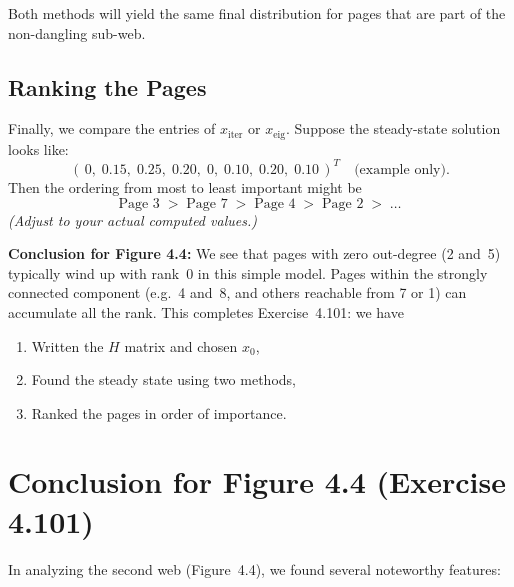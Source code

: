 \documentclass{article}
\begin{document}
\noindent
Both methods will yield the same final distribution for pages that are part of the non-dangling sub-web.

\subsection{Ranking the Pages}
Finally, we compare the entries of $x_{\text{iter}}$ or $x_{\text{eig}}$. 
Suppose the steady-state solution looks like:
\[
(\,0,\; 0.15,\; 0.25,\; 0.20,\; 0,\; 0.10,\; 0.20,\; 0.10\,)^T
\quad\text{(example only)}.
\]
Then the ordering from most to least important might be
\[
\text{Page~3} \;>\; \text{Page~7} \;>\; \text{Page~4} \;>\; \text{Page~2} \;>\; \ldots
\]
\emph{(Adjust to your actual computed values.)}

\bigskip
\noindent
\textbf{Conclusion for Figure 4.4:} 
We see that pages with zero out-degree (2 and~5) typically wind up with rank~0 
in this simple model.  Pages within the strongly connected component (e.g.\ 4 and~8, 
and others reachable from 7 or 1) can accumulate all the rank.  This completes 
Exercise~4.101: we have 
\begin{enumerate}
  \item Written the $H$ matrix and chosen $x_0$,
  \item Found the steady state using two methods,
  \item Ranked the pages in order of importance.
\end{enumerate}




\section{Conclusion for Figure 4.4 (Exercise 4.101)}
\label{sec:conclusion-fig4-4}

In analyzing the second web (Figure~4.4), we found several noteworthy features:
\end{document}
